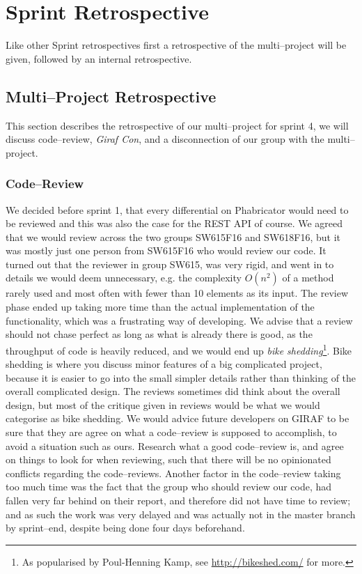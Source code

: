 \section{Sprint Retrospective}\label{sec:S4retro}

Like other Sprint retrospectives first a retrospective of the multi--project will be given, followed by an internal retrospective.

\subsection{Multi--Project Retrospective}
This section describes the retrospective of our multi--project for sprint 4, we will discuss code--review, \textit{Giraf Con}, and a disconnection of our group with the multi--project.

\subsubsection*{Code--Review}
We decided before sprint 1, that every differential on Phabricator would need to be reviewed and this was also the case for the REST API of course.
We agreed that we would review across the two groups SW615F16 and SW618F16, but it was mostly just one person from SW615F16 who would review our code.
It turned out that the reviewer in group SW615, was very rigid, and went in to details we would deem unnecessary, e.g. the complexity $O(n^2)$ of a method rarely used and most often with fewer than 10 elements as its input.
The review phase ended up taking more time than the actual implementation of the functionality, which was a frustrating way of developing.
We advise that a review should not chase perfect as long as what is already there is good, as the throughput of code is heavily reduced, and we would end up \textit{bike shedding}\footnote{As popularised by Poul-Henning Kamp, see \url{http://bikeshed.com/} for more.}.
Bike shedding is where you discuss minor features of a big complicated project, because it is easier to go into the small simpler details rather than thinking of the overall complicated design.
The reviews sometimes did think about the overall design, but most of the critique given in reviews would be what we would categorise as bike shedding.
We would advice future developers on GIRAF to be sure that they are agree on what a code--review is supposed to accomplish, to avoid a situation such as ours.
Research what a good code--review is, and agree on things to look for when reviewing, such that there will be no opinionated conflicts regarding the code--reviews.
Another factor in the code--review taking too much time was the fact that the group who should review our code, had fallen very far behind on their report, and therefore did not have time to review; and as such the work was very delayed and was actually not in the master branch by sprint--end, despite being done four days beforehand.

